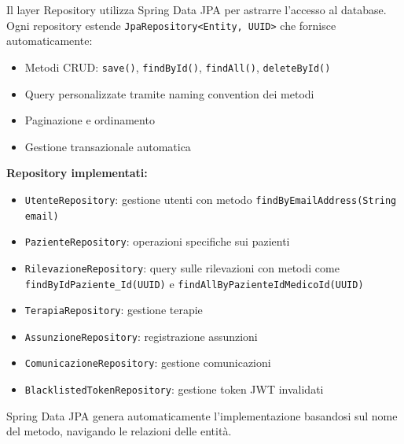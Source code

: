 \documentclass{report}
\begin{document}
Il layer Repository utilizza Spring Data JPA per astrarre l'accesso al database.
Ogni repository estende \texttt{JpaRepository<Entity, UUID>} che fornisce automaticamente:

\begin{itemize}
    \item Metodi CRUD: \texttt{save()}, \texttt{findById()}, \texttt{findAll()}, 
    \texttt{deleteById()}
    \item Query personalizzate tramite naming convention dei metodi
    \item Paginazione e ordinamento
    \item Gestione transazionale automatica
\end{itemize}

\textbf{Repository implementati:}
\begin{itemize}
    \item \texttt{UtenteRepository}: gestione utenti con metodo 
    \texttt{findByEmailAddress(String email)}
    \item \texttt{PazienteRepository}: operazioni specifiche sui pazienti
    \item \texttt{RilevazioneRepository}: query sulle rilevazioni con metodi come 
    \texttt{findByIdPaziente\_Id(UUID)} e \texttt{findAllByPazienteIdMedicoId(UUID)}
    \item \texttt{TerapiaRepository}: gestione terapie
    \item \texttt{AssunzioneRepository}: registrazione assunzioni
    \item \texttt{ComunicazioneRepository}: gestione comunicazioni
    \item \texttt{BlacklistedTokenRepository}: gestione token JWT invalidati
\end{itemize}

Spring Data JPA genera automaticamente l'implementazione basandosi sul nome del metodo,
navigando le relazioni delle entità.
\end{document}
